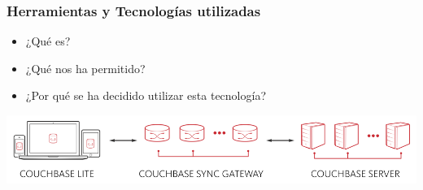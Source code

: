 \begin{frame}
\begin{columns}
\begin{column}{0.3\textwidth}
\begin{center}
					\end{center}
			\end{column}
		\end{columns}
	\endblock{}
\end{frame}

\begin{frame}
	\frametitle{Herramientas y Tecnologías utilizadas}
			\begin{itemize}
				\item {¿Qué es?}
				\item {¿Qué nos ha permitido?}
				\item {¿Por qué se ha decidido utilizar esta tecnología?}
			\end{itemize}
		\endblock{}
		\vfill 
			\begin{center}
				\includegraphics[width=0.8\linewidth]{Images/couchBase}
			\end{center}
\end{frame}


